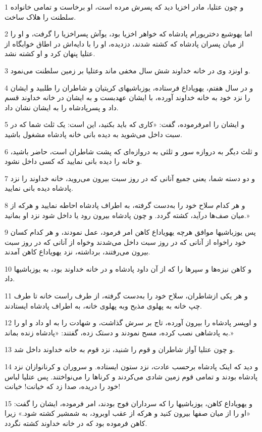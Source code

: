 \par 1 و چون عتلیا، مادر اخزیا دید که پسرش مرده است، او برخاست و تمامی خانواده سلطنت را هلاک ساخت.
\par 2 اما یهوشبع دختریورام پادشاه که خواهر اخزیا بود، یوآش پسراخزیا را گرفت، و او را از میان پسران پادشاه که کشته شدند، دزدیده، او را با دایه‌اش در اطاق خوابگاه از عتلیا پنهان کرد و او کشته نشد.
\par 3 و اونزد وی در خانه خداوند شش سال مخفی ماند وعتلیا بر زمین سلطنت می‌نمود.
\par 4 و در سال هفتم، یهویاداع فرستاده، یوزباشیهای کریتیان و شاطران را طلبید و ایشان را نزد خود به خانه خداوند آورده، با ایشان عهدبست و به ایشان در خانه خداوند قسم داد و پسرپادشاه را به ایشان نشان داد.
\par 5 و ایشان را امرفرموده، گفت: «کاری که باید بکنید، این است: یک ثلث شما که در سبت داخل می‌شوید به دیده بانی خانه پادشاه مشغول باشید.
\par 6 و ثلث دیگر به دروازه سور و ثلثی به دروازه‌ای که پشت شاطران است، حاضر باشید، و خانه را دیده بانی نمایید که کسی داخل نشود.
\par 7 و دو دسته شما، یعنی جمیع آنانی که در روز سبت بیرون می‌روید، خانه خداوند را نزد پادشاه دیده بانی نمایید.
\par 8 و هر کدام سلاح خود را به‌دست گرفته، به اطراف پادشاه احاطه نمایید و هر‌که از میان صف‌ها درآید، کشته گردد. و چون پادشاه بیرون رود یا داخل شود نزد او بمانید.»
\par 9 پس یوزباشیها موافق هر‌چه یهویاداع کاهن امر فرمود، عمل نمودند، و هر کدام کسان خود راخواه از آنانی که در روز سبت داخل می‌شدند وخواه از آنانی که در روز سبت بیرون می‌رفتند، برداشته، نزد یهویاداع کاهن آمدند.
\par 10 و کاهن نیزه‌ها و سپرها را که از آن داود پادشاه و در خانه خداوند بود، به یوزباشیها داد.
\par 11 و هر یکی ازشاطران، سلاح خود را به‌دست گرفته، از طرف راست خانه تا طرف چپ خانه به پهلوی مذبح وبه پهلوی خانه، به اطراف پادشاه ایستادند.
\par 12 و اوپسر پادشاه را بیرون آورده، تاج بر سرش گذاشت، و شهادت را به او داد و او را به پادشاهی نصب کرده، مسح نمودند و دستک زده، گفتند: «پادشاه زنده بماند.»
\par 13 و چون عتلیا آواز شاطران و قوم را شنید، نزد قوم به خانه خداوند داخل شد.
\par 14 و دید که اینک پادشاه بر‌حسب عادت، نزد ستون ایستاده. و سروران و کرنانوازان نزد پادشاه بودند و تمامی قوم زمین شادی می‌کردند و کرناها را می‌نواختند. پس عتلیا لباس خود را دریده، صدا زد که خیانت! خیانت!
\par 15 و یهویاداع کاهن، یوزباشیها را که سرداران فوج بودند، امر فرموده، ایشان را گفت: «او را از میان صفها بیرون کنید و هر‌که از عقب اوبرود، به شمشیر کشته شود.» زیرا کاهن فرموده بود که در خانه خداوند کشته نگردد.
